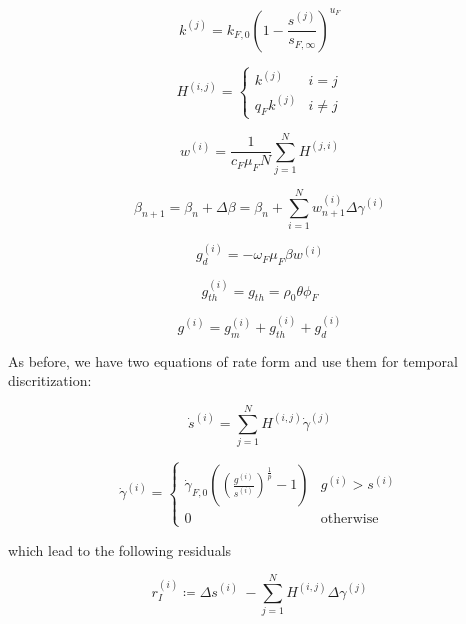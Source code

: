 \documentclass{article}
\begin{document}
\begin{equation}
    k^{(j)} = k_{F,0} \left( 1 - \frac{s^{(j)}}{s_{F,\infty}} \right)^{u_F}
\end{equation}

\begin{equation}
    H^{(i,j)} =
    \begin{cases}
        k^{(j)}       &   i = j\\
        q_F k^{(j)}   &   i \neq j
    \end{cases}
\end{equation}

\begin{equation}
    w^{(i)} = \frac{1}{c_F \mu_F N} \sum_{j=1}^N H^{(j,i)}
\end{equation}

\begin{equation}
    \beta_{n+1} = \beta_n + \Delta \beta = \beta_n + \sum_{i=1}^N w_{n+1}^{(i)} \Delta \gamma^{(i)}
\end{equation}

\begin{equation}
    g_d^{(i)} = - \omega_F \mu_F \beta w^{(i)}
\end{equation}

\begin{equation}
    g_{th}^{(i)} = g_{th} = \rho_0 \theta \phi_F
\end{equation}

\begin{equation}
    g^{(i)} = g_{m}^{(i)} + g_{th}^{(i)} + g_{d}^{(i)}
\end{equation}


As before, we have two equations of rate form and use them for temporal discritization:

\begin{equation}
    \dot{s}^{(i)} = \sum_{j=1}^N H^{(i,j)} \dot{\gamma}^{(j)}
\end{equation}

\begin{equation}
    \dot{\gamma}^{(i)} =
    \begin{cases}
        \dot{\gamma}_{F,0} \left(\left(\frac{g^{(i)}}{s^{(i)}}\right)^{\frac{1}{p}} - 1 \right) & g^{(i)} > s^{(i)}\\
        0 & \text{otherwise}
    \end{cases}
\end{equation}

which lead to the following residuals

\begin{equation}
    r_I^{(i)} \coloneqq \Delta s^{(i)}\ - \sum_{j=1}^N H^{(i,j)} \Delta \gamma^{(j)}
\end{equation}
\end{document}
